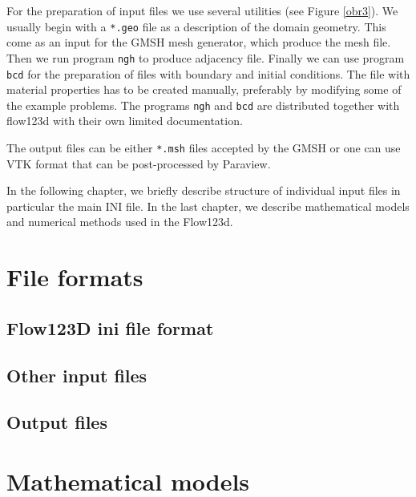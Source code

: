 \documentclass[12pt,a4paper]{report}
\begin{document}
For the preparation of input files we use several utilities (see Figure \ref{obr3}). 
We usually begin with a \verb'*.geo' file as a description of the domain geometry. This come as an input for the GMSH mesh generator, which produce 
the mesh file. Then we run program \verb'ngh' to produce adjacency file. Finally we can use program \verb'bcd' for the preparation of files with
boundary and initial conditions. The file with material properties has to be created manually, preferably by modifying some of the example problems.
The programs \verb'ngh' and \verb'bcd' are distributed together with flow123d with their own limited documentation.

The output files can be either \verb'*.msh' files accepted by the GMSH or one can use VTK format that can be post-processed by Paraview.

In the following chapter, we briefly describe structure of individual input files in particular the main INI file. In the last chapter, we describe
mathematical models and numerical methods used in the Flow123d.



\chapter{File formats}
\section{Flow123D ini file format}



\section{Other input files}



\section{Output files}

% 
%   


\chapter{Mathematical models}












\end{document}
